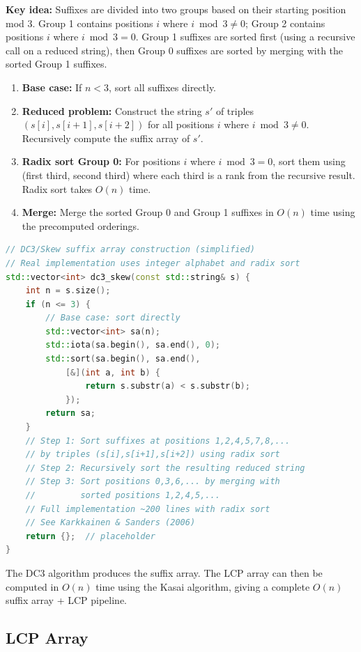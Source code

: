 \textbf{Key idea:} Suffixes are divided into two groups based on their starting position mod 3. Group 1 contains positions $i$ where $i \bmod 3 \neq 0$; Group 2 contains positions $i$ where $i \bmod 3 = 0$. Group 1 suffixes are sorted first (using a recursive call on a reduced string), then Group 0 suffixes are sorted by merging with the sorted Group 1 suffixes.

\begin{enumerate}
    \item \textbf{Base case:} If $n < 3$, sort all suffixes directly.
    \item \textbf{Reduced problem:} Construct the string $s'$ of triples $(s[i], s[i+1], s[i+2])$ for all positions $i$ where $i \bmod 3 \neq 0$. Recursively compute the suffix array of $s'$.
    \item \textbf{Radix sort Group 0:} For positions $i$ where $i \bmod 3 = 0$, sort them using (first third, second third) where each third is a rank from the recursive result. Radix sort takes $O(n)$ time.
    \item \textbf{Merge:} Merge the sorted Group 0 and Group 1 suffixes in $O(n)$ time using the precomputed orderings.
\end{enumerate}

\begin{lstlisting}[language=C++]
// DC3/Skew suffix array construction (simplified)
// Real implementation uses integer alphabet and radix sort
std::vector<int> dc3_skew(const std::string& s) {
    int n = s.size();
    if (n <= 3) {
        // Base case: sort directly
        std::vector<int> sa(n);
        std::iota(sa.begin(), sa.end(), 0);
        std::sort(sa.begin(), sa.end(),
            [&](int a, int b) {
                return s.substr(a) < s.substr(b);
            });
        return sa;
    }
    // Step 1: Sort suffixes at positions 1,2,4,5,7,8,...
    // by triples (s[i],s[i+1],s[i+2]) using radix sort
    // Step 2: Recursively sort the resulting reduced string
    // Step 3: Sort positions 0,3,6,... by merging with
    //         sorted positions 1,2,4,5,...
    // Full implementation ~200 lines with radix sort
    // See Karkkainen & Sanders (2006)
    return {};  // placeholder
}
\end{lstlisting}

The DC3 algorithm produces the suffix array. The LCP array can then be computed in $O(n)$ time using the Kasai algorithm, giving a complete $O(n)$ suffix array + LCP pipeline.

\subsection{LCP Array}


